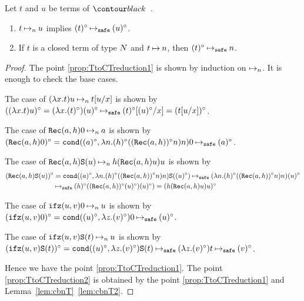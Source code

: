 \begin{proposition}\label{prop:TtoCTreduction}
  Let $t$ and $u$ be terms of $\systemT$.  
  \begin{enumerate}
  \item\label{prop:TtoCTreduction1}
    $t\mathbin{\mapsto}_n u$ implies $(t)^\circ \mathbin{\mathbin{\mapsto}_{\hbox{\scriptsize \tt safe}}} (u)^\circ$. 
  \item\label{prop:TtoCTreduction2}
    If $t$ is a closed term of type ${N}$ and $t\mathbin{\mapsto} n$, then $(t)^\circ \mathbin{\mathbin{\mapsto}_{\hbox{\scriptsize \tt safe}}} n$. 
  \end{enumerate}
\end{proposition}  
\begin{proof}
  The point \ref{prop:TtoCTreduction1} is shown by induction on $\mathbin{\mapsto}_n$.
  It is enough to check the base cases.

  The case of $(\lambda x.t)u \mathbin{\mapsto}_n t[u/x]$ is shown by 
  $((\lambda x.t)u)^\circ = (\lambda x.(t)^\circ)(u)^\circ \mathbin{\mathbin{\mapsto}_{\hbox{\scriptsize \tt safe}}} (t)^\circ[(u)^\circ/x] = (t[u/x])^\circ$. 

  The case of ${\tt Rec}(a,h)0 \mathbin{\mapsto}_n a$ is shown by
  $({\tt Rec}(a,h)0)^\circ = {\tt cond}((a)^\circ,\lambda n.(h)^\circ(({\tt Rec}(a,h))^\circ n)n)0 \mathbin{\mathbin{\mapsto}_{\hbox{\scriptsize \tt safe}}} (a)^\circ$.

  The case of ${\tt Rec}(a,h){\tt S}(u) \mathbin{\mapsto}_n h({\tt Rec}(a,h)u)u$ is shown by
  \begin{align*}
    ({\tt Rec}(a,h){\tt S}(u))^\circ
    &= {\tt cond}((a)^\circ,\lambda n.(h)^\circ(({\tt Rec}(a,h))^\circ n)n){\tt S}((u)^\circ)
    \mathbin{\mathbin{\mapsto}_{\hbox{\scriptsize \tt safe}}} (\lambda n.(h)^\circ(({\tt Rec}(a,h))^\circ n)n)(u)^\circ
    \\
    &\mathbin{\mathbin{\mapsto}_{\hbox{\scriptsize \tt safe}}} (h)^\circ(({\tt Rec}(a,h))^\circ(u)^\circ)(u)^\circ)
    = (h({\tt Rec}(a,h)u)u)^\circ
  \end{align*}
  
  The case of ${\tt ifz}(u,v)0 \mathbin{\mapsto}_n u$ is shown by
  $({\tt ifz}(u,v)0)^\circ = {\tt cond}((u)^\circ,\lambda z.(v)^\circ)0 \mathbin{\mathbin{\mapsto}_{\hbox{\scriptsize \tt safe}}} (u)^\circ$.

  The case of ${\tt ifz}(u,v){\tt S}(t) \mathbin{\mapsto}_n u$ is shown by
  $({\tt ifz}(u,v){\tt S}(t))^\circ = {\tt cond}((u)^\circ,\lambda z.(v)^\circ){\tt S}(t) \mathbin{\mathbin{\mapsto}_{\hbox{\scriptsize \tt safe}}} (\lambda z.(v)^\circ)t \mathbin{\mathbin{\mapsto}_{\hbox{\scriptsize \tt safe}}} (v)^\circ$.

  Hence we have the point \ref{prop:TtoCTreduction1}.
  The point \ref{prop:TtoCTreduction2} is obtained by the point \ref{prop:TtoCTreduction1}
  and Lemma~\ref{lem:cbnT}~\ref{lem:cbnT2}. 
\end{proof}


